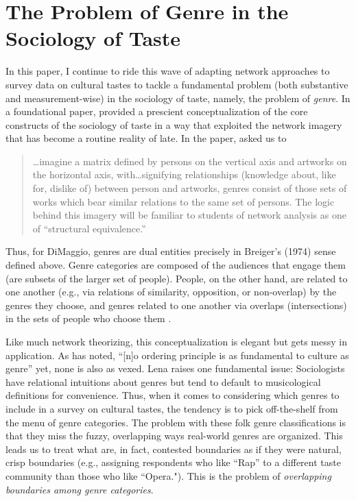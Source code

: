 \documentclass[a4paper,12pt]{extarticle}
\begin{document}
\section{The Problem of Genre in the Sociology of Taste}
In this paper, I continue to ride this wave of adapting network approaches to survey data on cultural tastes to tackle a fundamental problem (both substantive and measurement-wise) in the sociology of taste, namely, the problem of \textit{genre}. In a foundational paper, \citet{dimaggio1987classification} provided a prescient conceptualization of the core constructs of the sociology of taste in a way that exploited the network imagery that has become a routine reality of late. In the paper, \citet[244]{dimaggio1987classification} asked us to

\begin{quote}
   {\dots}imagine a matrix defined by persons on the vertical axis and artworks on the horizontal axis, with{\dots}signifying relationships (knowledge about, like for, dislike of) between person and artworks, genres consist of those sets of works which bear similar relations to the same set of persons. The logic behind this imagery will be familiar to students of network analysis as one of ``structural equivalence.''
\end{quote}

Thus, for DiMaggio, genres are dual entities precisely in Breiger's (1974) sense defined above. Genre categories are composed of the audiences that engage them (are subsets of the larger set of people). People, on the other hand, are related to one another (e.g., via relations of similarity, opposition, or non-overlap) by the genres they choose, and genres related to one another via overlaps (intersections) in the sets of people who choose them \citet{lizardo18}. 

Like much network theorizing, this conceptualization is elegant but gets messy in application. As \citet[149]{lena2015relational} has noted, ``[n]o ordering principle is as fundamental to culture as genre'' yet, none is also as vexed. Lena raises one fundamental issue: Sociologists have relational intuitions about genres but tend to default to musicological definitions for convenience. Thus, when it comes to considering which genres to include in a survey on cultural tastes, the tendency is to pick off-the-shelf from the menu of genre categories. The problem with these folk genre classifications is that they miss the fuzzy, overlapping ways real-world genres are organized. This leads us to treat what are, in fact, contested boundaries as if they were natural, crisp boundaries (e.g., assigning respondents who like ``Rap'' to a different taste community than those who like ``Opera."). This is the problem of \textit{overlapping boundaries among genre categories}. 
\end{document}
